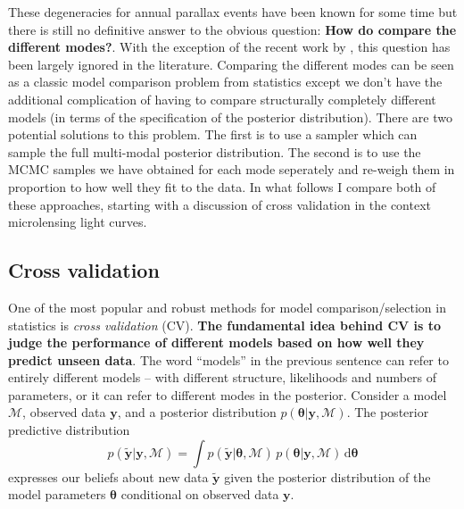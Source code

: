 \documentclass[12pt,dvipsnames]{report}
\newcommand{\ud}{\,\mathrm{d}}
\renewcommand{\vec}[1]{\boldsymbol{\mathbf{#1}}}
\begin{document}
These degeneracies for annual parallax events have been known for some time 
\citep{2004ApJ...606..319G} but there is still no definitive answer to the obvious 
question: \textbf{How do compare the different modes?}. 
With the exception of the recent work by \citet{2022MNRAS.514.4845K}, this question has
been largely ignored in the literature. Comparing the different modes can be seen as a
classic model comparison problem from statistics except we don't have the additional
complication of having to compare structurally completely different models 
(in terms of the specification of the posterior distribution). There are two potential 
solutions to this problem. The first is to use a sampler which can sample the full 
multi-modal posterior distribution. The second is to use the MCMC samples we have 
obtained for each mode seperately and re-weigh them in proportion to how well 
they fit to the data. 
In what follows I compare both of these approaches, starting with a discussion of 
cross validation in the context  microlensing light curves.

\subsection{Cross validation}
One of the most popular and robust methods for model comparison/selection in statistics
is \emph{cross validation} (CV).
\textbf{The fundamental idea behind CV is to judge the performance 
of different models based on how well they predict unseen data}. The word ``models'' in 
the previous sentence can refer to entirely different models -- with 
different structure, likelihoods and numbers of parameters, or it can 
refer to different modes in the posterior. Consider a model $\mathcal{M}$, observed
data $\vec y$, and a posterior distribution $p(\vec \theta \vert \vec y,\mathcal{M})$.
The posterior predictive distribution 
\begin{equation}
p(\tilde{\vec y}|\vec y,\mathcal{M})=\int p(\tilde{\vec y}|\vec \theta,\mathcal{M})\,p(\vec \theta|\vec y,\mathcal{M})\ud\vec \theta
\end{equation}
expresses our beliefs about new data $\tilde{\vec y}$ given the posterior distribution
of the model parameters $\vec\theta$ conditional on observed data $\vec y$.
\end{document}
